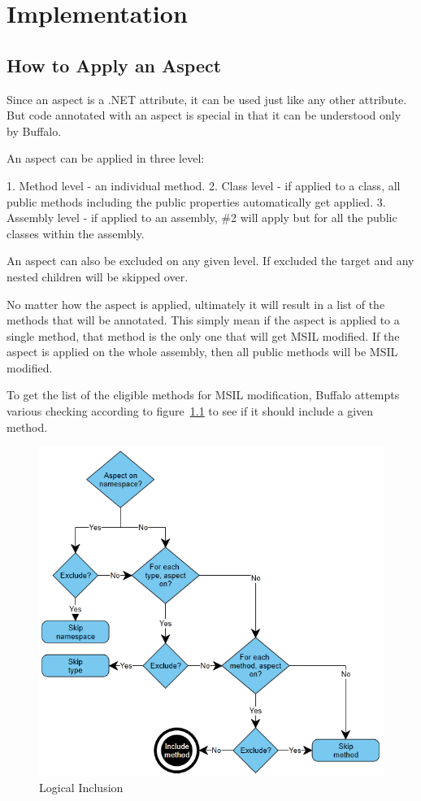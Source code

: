\chapter{Implementation}

\section{How to Apply an Aspect}

Since an aspect is a .NET attribute, it can be used just like any other attribute. But code annotated with an aspect is special in that it can be understood only by Buffalo.

An aspect can be applied in three level:

1. Method level - an individual method.
2. Class level - if applied to a class, all public methods including the public properties automatically get applied.
3. Assembly level - if applied to an assembly, \#2 will apply but for all the public classes within the assembly.

An aspect can also be excluded on any given level. If excluded the target and any nested children will be skipped over. 

No matter how the aspect is applied, ultimately it will result in a list of the methods that will be annotated. This simply mean if the aspect is applied to a single method, that method is the only one that will get MSIL modified. If the aspect is applied on the whole assembly, then all public methods will be MSIL modified.

To get the list of the eligible methods for MSIL modification, Buffalo attempts various checking according to figure~\ref{logical_inclusion} to see if it should include a given method.

\begin{figure}[H]
  \includegraphics[scale=1.0]{AspectLogicalInclusion.PNG}
  \centering
  \caption{Logical Inclusion\label{logical_inclusion}}
\end{figure}

